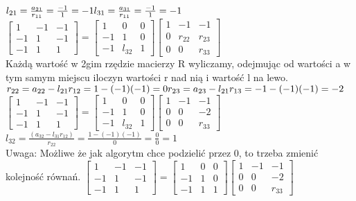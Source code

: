 \documentclass{article}
\begin{document}
$l_{21}=\frac{a_{21}}{r_{11}}=\frac{-1}{1}=-1\\l_{31}=\frac{a_{31}}{r_{11}}=\frac{-1}{1}=-1$\\
$\begin{bmatrix} 1 & -1 & -1 \\ -1 & 1 & -1 \\ -1 & 1 & 1 \end{bmatrix}=\begin{bmatrix} 1 & 0 & 0 \\ -1 & 1 & 0 \\ -1 & l_{32} & 1 \end{bmatrix} \begin{bmatrix} 1 & -1 & -1 \\ 0 & r_{22} & r_{23} \\ 0 & 0 & r_{33} \end{bmatrix}$\\
Każdą wartość w 2gim rzędzie macierzy R wyliczamy, odejmując od wartości a w tym samym miejscu iloczyn wartości r nad nią i wartość l na lewo.\\
$r_{22}=a_{22}-l_{21}r_{12}=1-(-1)(-1)=0\\r_{23}=a_{23}-l_{21}r_{13}=-1-(-1)(-1)=-2$\\
$\begin{bmatrix} 1 & -1 & -1 \\ -1 & 1 & -1 \\ -1 & 1 & 1 \end{bmatrix}=\begin{bmatrix} 1 & 0 & 0 \\ -1 & 1 & 0 \\ -1 & l_{32} & 1 \end{bmatrix} \begin{bmatrix} 1 & -1 & -1 \\ 0 & 0 & -2 \\ 0 & 0 & r_{33} \end{bmatrix}$\\
$l_{32}=\frac{(a_{32}-l_{31}r_{12})}{r_{22}}=\frac{1-(-1)(-1)}{0}=\frac{0}{0}=1$\\
Uwaga: Możliwe że jak algorytm chce podzielić przez 0, to trzeba zmienić kolejność równań.
$\begin{bmatrix} 1 & -1 & -1 \\ -1 & 1 & -1 \\ -1 & 1 & 1 \end{bmatrix}=\begin{bmatrix} 1 & 0 & 0 \\ -1 & 1 & 0 \\ -1 & 1 & 1 \end{bmatrix} \begin{bmatrix} 1 & -1 & -1 \\ 0 & 0 & -2 \\ 0 & 0 & r_{33} \end{bmatrix}$\\
\end{document}
